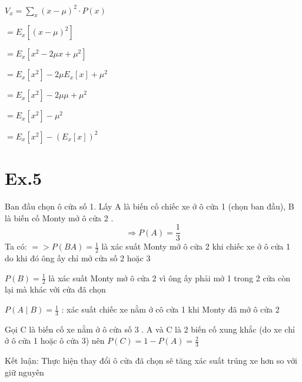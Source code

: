 \documentclass[10pt]{article}
\begin{document}
$V_{x}=\sum_{x}(x-\mu)^{2} \cdot P(x)$

$=E_{x}\left[(x-\mu)^{2}\right]$

$=E_{x}\left[x^{2}-2 \mu x+\mu^{2}\right]$

$=E_{x}\left[x^{2}\right]-2 \mu E_{x}[x]+\mu^{2}$

$=E_{x}\left[x^{2}\right]-2 \mu \mu+\mu^{2}$

$=E_{x}\left[x^{2}\right]-\mu^{2}$

$=E_{x}\left[x^{2}\right]-\left(E_{x}[x]\right)^{2}$

\section{Ex.5}
Ban đầu chọn ô cửa số 1. Lấy $\mathrm{A}$ là biến cố chiếc xe ở ô cửa 1 (chọn ban đầu), B là biến cố Monty mở ô cửa 2 .
$$
\Rightarrow P(A)=\frac{1}{3}
$$
Ta có: $=>P(B A)=\frac{1}{2}$ là xác suất Monty mở ô cửa 2 khi chiếc xe ở ô cửa 1 do khi đó ông ấy chỉ mở cửa số 2 hoặc 3

$P(B)=\frac{1}{2}$ là xác suất Monty mở ô cửa 2 vì ông ấy phải mở 1 trong 2 cửa còn lại mà khác với cửa đã chọn

$P(A \mid B)=\frac{1}{3}$ : xác suất chiếc xe nằm ở cô cửa 1 khi Monty đã mở ô cửa 2

Gọi $\mathrm{C}$ là biến cố xe nằm ở ô cửa số 3 . $\mathrm{A}$ và $\mathrm{C}$ là 2 biến cố xung khắc (do xe chỉ ở ô cửa 1 hoặc ô cửa 3) nên $P(C)=1-P(A)=\frac{2}{3}$

Kết luận: Thực hiện thay đổi ô cửa đã chọn sẽ tăng xác suất trúng xe hơn so với giữ nguyên
\end{document}
